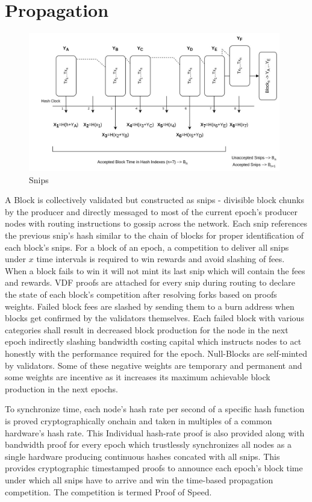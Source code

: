 \documentclass[a4paper,10pt]{article}
\begin{document}
\section{Propagation}
\begin{figure}[H]
\begin{center}
\includegraphics[width=11cm]{Snips}
\caption{Snips}
\end{center}
\end{figure}
A Block is collectively validated but constructed as snips - divisible block chunks by the producer and directly messaged to most of the current epoch's producer nodes with routing instructions to gossip across the network. Each snip references the previous snip's hash similar to the chain of blocks for proper identification of each block's snips. For a block of an epoch, a competition to deliver all snips under $x$ time intervals is required to win rewards and avoid slashing of fees. When a block fails to win it will not mint its last snip which will contain the fees and rewards. VDF proofs are attached for every snip during routing to declare the state of each block's competition after resolving forks based on proofs weights. Failed block fees are slashed by sending them to a burn address when blocks get confirmed by the validators themselves. Each failed block with various categories shall result in decreased block production for the node in the next epoch indirectly slashing bandwidth costing capital which instructs nodes to act honestly with the performance required for the epoch. Null-Blocks are self-minted by validators. Some of these negative weights are temporary and permanent and some weights are incentive as it increases its maximum achievable block production in the next epochs. 

To synchronize time, each node's hash rate per second of a specific hash function is proved cryptographically onchain and taken in multiples of a common hardware's hash rate. This Individual hash-rate proof is also provided along with bandwidth proof for every epoch which trustlessly synchronizes all nodes as a single hardware producing continuous hashes concated with all snips. This provides cryptographic timestamped proofs to announce each epoch's block time under which all snips have to arrive and win the time-based propagation competition. The competition is termed Proof of Speed.
\end{document}
